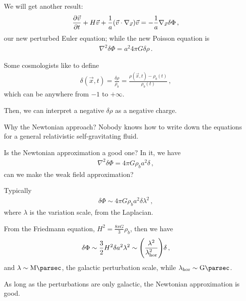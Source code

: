 \documentclass[main.tex]{subfiles}
\begin{document}
We will get another result: 
%
\begin{align}
  \pdv{\vec{v}}{t} + H \vec{v} + \frac{1}{a} \qty(\vec{v} \cdot \nabla_{\vec{x}}) \vec{v} = - \frac{1}{a} \nabla_{\vec{x}} \delta \Phi 
\,,
\end{align}
%
our new perturbed Euler equation; while the new Poisson equation is 
%
\begin{align}
  \nabla^2 \delta \Phi = a^2 4 \pi G \delta \rho 
\,.
\end{align}

Some cosmologists like to define 
%
\begin{align}
  \delta (\vec{x}, t) = \frac{ \delta \rho}{\rho _b} = \frac{\rho (\vec{x}, t) - \rho _b (t)}{\rho _b (t)}
\,,
\end{align}
%
which can be anywhere from \(-1\) to \(+ \infty \). 

Then, we can interpret a negative \(\delta \rho \) as a negative charge. 

Why the Newtonian approach? Nobody knows how to write down the equations for a general relativistic self-gravitating fluid. 

Is the Newtonian approximation a good one? In it, we have 
%
\begin{align}
  \nabla^2 \delta \Phi  = 4 \pi G \rho _b a^2 \delta 
\,,
\end{align}
%
can we make the weak field approximation? 

Typically 
%
\begin{align}
  \delta \Phi \sim 4 \pi G \rho _b a^2 \delta \lambda^2
\,,
\end{align}
%
where \(\lambda \) is the variation scale, from the Laplacian. 

From the Friedmann equation, \(H^2=  \frac{8 \pi G}{3} \rho_b\), then we have 
%
\begin{align}
  \delta \Phi \sim \frac{3}{2} H^2 \delta a^2 \lambda^2 \sim  \qty(\frac{\lambda^2  }{\lambda _{\text{hor}}^2}) \delta 
\,,
\end{align}
%
and \(\lambda \sim \SI{}{\mega\parsec}\), the galactic perturbation scale, while \(\lambda _{\text{hor}} \sim \SI{}{\giga\parsec}\). 

As long as the perturbations are only galactic, the Newtonian approximation is good. 
\end{document}

